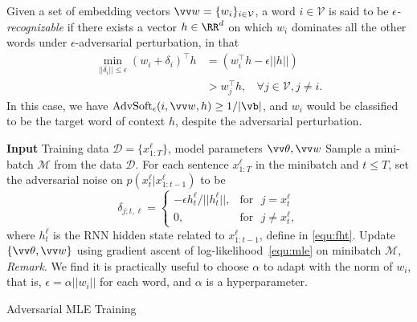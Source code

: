 \documentclass{article}
\newcommand{\ours}{{\mathrm{AdvSoft}}}
\newcommand{\advsoft}{\ours}
\begin{document}
\begin{mydef}\label{def:word}
Given a set of embedding vectors $\vv w = \{w_i\}_{i\in \mathcal V}$, 
a word $i\in \mathcal V$ is said to be \emph{$\epsilon$-recognizable} 
if there exists a vector $h \in \RR^d$  
on which $w_i$ dominates 
all the other words under  $\epsilon$-adversarial perturbation, in that 
\begin{align*} 
\min_{||\delta_i||\leq \epsilon} (w_i + \delta_i)^\top h
& = (w_i^\top h - \epsilon ||h||) \\
& > w_j^\top h, ~~~~  \forall  j\in \mathcal V, j\neq i.
\end{align*}
In this case, 
we have $\advsoft_\epsilon(i, \vv w, h)\geq 1/|\vb|$, and 
$w_i$ would be classified to be the target word of context $h$, despite the adversarial perturbation. 
\end{mydef}




\begin{algorithm}[t] \begin{algorithmic} \STATE \textbf{Input} Training data $\mathcal D=\{x_{1:T}^\ell\}$, model parameters $\vv \theta, \vv w$
    \STATE Sample a mini-batch $\mathcal{M}$ from the data $\mathcal D.$ 
    \STATE For each sentence $x_{1:T}^\ell$ in the minibatch and $t \leq T$, 
set the adversarial noise on $p(x_{t}^\ell|x_{1:t-1}^\ell)$ to be  
    $$
        \delta_{j;t,\ell}  = 
    \begin{cases}
     - \epsilon h_t^\ell/||h_t^\ell||,  &\text{for~~} {j = x_{t}^\ell} \\ 
     0, & \text{for~~}{j \neq x_{t}^\ell}, 
    \end{cases}
    $$
    where $h_t^\ell$ is the RNN hidden state related to $x_{1:t-1}^\ell$, define in \eqref{equ:fht}.  
\STATE Update $\{\vv\theta, \vv w\}$ using gradient ascent of log-likelihood~\eqref{equ:mle} on minibatch $\mathcal M$, 
\ENDWHILE 
\STATE 
\emph{Remark}. We find it is practically useful to choose $\alpha$ to adapt with the norm of $w_i$, that is, 
$\epsilon = \alpha ||w_i||$ for each word, and $\alpha$ is a hyperparameter.     
\end{algorithmic}
\caption{Adversarial MLE Training} 
\label{alg:main} 
\end{algorithm}
\end{document}
